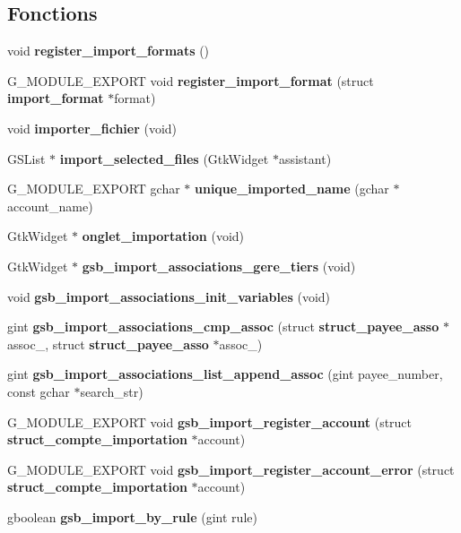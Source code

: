 \subsection*{Fonctions}
\begin{DoxyCompactItemize}
\item 
void {\bf register\_\-import\_\-formats} ()
\item 
G\_\-MODULE\_\-EXPORT void {\bf register\_\-import\_\-format} (struct {\bf import\_\-format} $\ast$format)
\item 
void {\bf importer\_\-fichier} (void)
\item 
GSList $\ast$ {\bf import\_\-selected\_\-files} (GtkWidget $\ast$assistant)
\item 
G\_\-MODULE\_\-EXPORT gchar $\ast$ {\bf unique\_\-imported\_\-name} (gchar $\ast$account\_\-name)
\item 
GtkWidget $\ast$ {\bf onglet\_\-importation} (void)
\item 
GtkWidget $\ast$ {\bf gsb\_\-import\_\-associations\_\-gere\_\-tiers} (void)
\item 
void {\bf gsb\_\-import\_\-associations\_\-init\_\-variables} (void)
\item 
gint {\bf gsb\_\-import\_\-associations\_\-cmp\_\-assoc} (struct {\bf struct\_\-payee\_\-asso} $\ast$assoc\_, struct {\bf struct\_\-payee\_\-asso} $\ast$assoc\_)
\item 
gint {\bf gsb\_\-import\_\-associations\_\-list\_\-append\_\-assoc} (gint payee\_\-number, const gchar $\ast$search\_\-str)
\item 
G\_\-MODULE\_\-EXPORT void {\bf gsb\_\-import\_\-register\_\-account} (struct {\bf struct\_\-compte\_\-importation} $\ast$account)
\item 
G\_\-MODULE\_\-EXPORT void {\bf gsb\_\-import\_\-register\_\-account\_\-error} (struct {\bf struct\_\-compte\_\-importation} $\ast$account)
\item 
gboolean {\bf gsb\_\-import\_\-by\_\-rule} (gint rule)
\end{DoxyCompactItemize}
